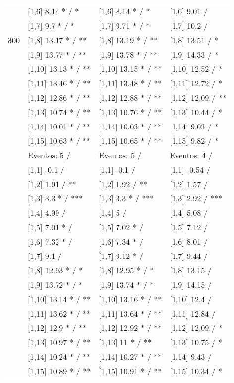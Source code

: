 \begin{table}
\begin{tabular}[t]{llll}
 & {}[1,6] 8.14 * / * & {}[1,6] 8.14 * / * & {}[1,6] 9.01  /\\
 & {}[1,7] 9.7 * / * & {}[1,7] 9.71 * / * & {}[1,7] 10.2  /\\
300 & {}[1,8] 13.17 * / ** & {}[1,8] 13.19 * / ** & {}[1,8] 13.51  / *\\
\addlinespace
 & {}[1,9] 13.77 * / ** & {}[1,9] 13.78 * / ** & {}[1,9] 14.33  / *\\
 & {}[1,10] 13.13 * / ** & {}[1,10] 13.15 * / ** & {}[1,10] 12.52  / *\\
 & {}[1,11] 13.46 * / ** & {}[1,11] 13.48 * / ** & {}[1,11] 12.72  / *\\
 & {}[1,12] 12.86 * / ** & {}[1,12] 12.88 * / ** & {}[1,12] 12.09  / **\\
 & {}[1,13] 10.74 * / ** & {}[1,13] 10.76 * / ** & {}[1,13] 10.44  / *\\
\addlinespace
 & {}[1,14] 10.01 * / ** & {}[1,14] 10.03 * / ** & {}[1,14] 9.03  / *\\
 & {}[1,15] 10.63 * / ** & {}[1,15] 10.65 * / ** & {}[1,15] 9.82  / *\\
 & Eventos:  5 / & Eventos:  5 / & Eventos:  4 /\\
 & {}[1,1] -0.1  / & {}[1,1] -0.1  / & {}[1,1] -0.54  /\\
 & {}[1,2] 1.91  / ** & {}[1,2] 1.92  / ** & {}[1,2] 1.57  /\\
\addlinespace
 & {}[1,3] 3.3 * / *** & {}[1,3] 3.3 * / *** & {}[1,3] 2.92  / ***\\
 & {}[1,4] 4.99  / & {}[1,4] 5  / & {}[1,4] 5.08  /\\
 & {}[1,5] 7.01 * / & {}[1,5] 7.02 * / & {}[1,5] 7.12  /\\
 & {}[1,6] 7.32 * / & {}[1,6] 7.34 * / & {}[1,6] 8.01  /\\
 & {}[1,7] 9.1  / & {}[1,7] 9.12 * / & {}[1,7] 9.44  /\\
\addlinespace
500 & {}[1,8] 12.93 * / * & {}[1,8] 12.95 * / * & {}[1,8] 13.15  /\\
 & {}[1,9] 13.72 * / * & {}[1,9] 13.74 * / * & {}[1,9] 14.15  /\\
 & {}[1,10] 13.14 * / ** & {}[1,10] 13.16 * / ** & {}[1,10] 12.4  /\\
 & {}[1,11] 13.62 * / ** & {}[1,11] 13.64 * / ** & {}[1,11] 12.84  /\\
 & {}[1,12] 12.9 * / ** & {}[1,12] 12.92 * / ** & {}[1,12] 12.09  / *\\
\addlinespace
 & {}[1,13] 10.97 * / ** & {}[1,13] 11 * / ** & {}[1,13] 10.75  / *\\
 & {}[1,14] 10.24 * / ** & {}[1,14] 10.27 * / ** & {}[1,14] 9.43  /\\
 & {}[1,15] 10.89 * / ** & {}[1,15] 10.91 * / ** & {}[1,15] 10.34  / *\\
\bottomrule
\end{tabular}
\end{table}
